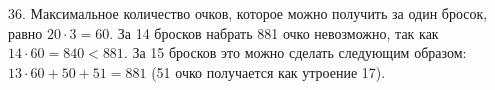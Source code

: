 36. Максимальное количество очков, которое можно получить за один бросок, равно $20\cdot3=60.$ За 14 бросков набрать 881 очко невозможно, так как $14\cdot60=840<881.$ За 15 бросков это можно сделать следующим образом: $13\cdot60+50+51=881$ (51 очко получается как утроение 17).\\
